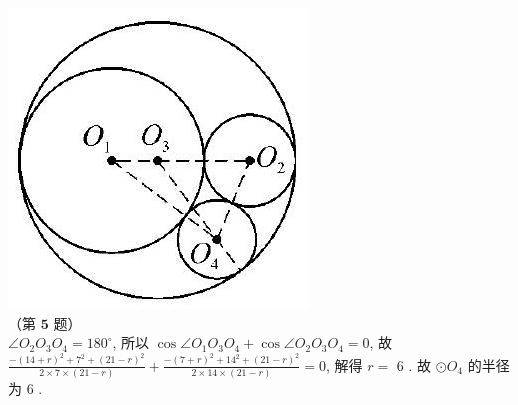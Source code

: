 \documentclass[10pt]{article}
\begin{document}
\begin{enumerate}
\includegraphics[max width=\textwidth, center]{2024_10_30_66b8e5e701da2093c133g-092(1)}\\
（第 $\mathbf{5}$ 题）\\
$\angle O_{2} O_{3} O_{4}=180^{\circ}$, 所以 $\cos \angle O_{1} O_{3} O_{4}+\cos \angle O_{2} O_{3} O_{4}=0$, 故 $\frac{-(14+r)^{2}+7^{2}+(21-r)^{2}}{2 \times 7 \times(21-r)}+\frac{-(7+r)^{2}+14^{2}+(21-r)^{2}}{2 \times 14 \times(21-r)}=0$, 解得 $r=$ 6 . 故 $\odot O_{4}$ 的半径为 6 .
\end{enumerate}
\end{document}

